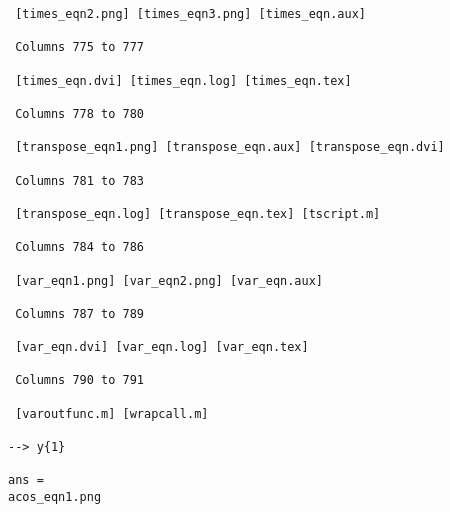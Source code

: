 \begin{verbatim}
 [times_eqn2.png] [times_eqn3.png] [times_eqn.aux] 

 Columns 775 to 777

 [times_eqn.dvi] [times_eqn.log] [times_eqn.tex] 

 Columns 778 to 780

 [transpose_eqn1.png] [transpose_eqn.aux] [transpose_eqn.dvi] 

 Columns 781 to 783

 [transpose_eqn.log] [transpose_eqn.tex] [tscript.m] 

 Columns 784 to 786

 [var_eqn1.png] [var_eqn2.png] [var_eqn.aux] 

 Columns 787 to 789

 [var_eqn.dvi] [var_eqn.log] [var_eqn.tex] 

 Columns 790 to 791

 [varoutfunc.m] [wrapcall.m] 

--> y{1}

ans = 
acos_eqn1.png
\end{verbatim}
